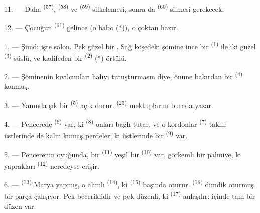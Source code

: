 

11. --- Daha  \textsuperscript{(57)},
 \textsuperscript{(58)} ve 
\textsuperscript{(59)} silkelemesi, sonra da 
\textsuperscript{(60)} silmesi gerekecek.

12. --- Çocuğun  \textsuperscript{(61)} gelince (o babo (*)),
o çoktan hazır.

\VUsaut{5.0mm}
\VUsaut{3.0mm}

1. --- Şimdi işte salon. Pek güzel bir . Sağ köşedeki şömine
ince bir  \textsuperscript{(1)} ile iki güzel 
\textsuperscript{(3)} süslü, ve kadifeden bir 
\textsuperscript{(2)} (*) örtülü.

2. --- Şöminenin kıvılcımları halıyı tutuşturmasın diye, önüne bakırdan bir
 \textsuperscript{(4)} konmuş.

3. --- Yanında şık bir  \textsuperscript{(5)} açık durur.
 \textsuperscript{(23)} mektuplarını burada yazar.

4. --- Pencerede  \textsuperscript{(6)} var, ki
 \textsuperscript{(8)} onları bağlı tutar, ve o kordonlar
 \textsuperscript{(7)} takılı; üstlerinde de kalın kumaş
perdeler, ki üstlerinde bir  \textsuperscript{(9)}
var.

5. --- Pencerenin oyuğunda, bir  \textsuperscript{(11)}
yeşil bir  \textsuperscript{(10)} var, görkemli bir palmiye,
ki yaprakları  \textsuperscript{(12)} neredeyse erişir.

6. ---  \textsuperscript{(13)} Marya yapmış,
o alımlı  \textsuperscript{(14)}, ki 
\textsuperscript{(15)} başında oturur.  \textsuperscript{(16)} dimdik
oturmuş bir parça çalışıyor. Pek beceriklidir ve pek düzenli, ki
 \textsuperscript{(17)} anlaşılır: içinde tam bir
düzen var.

